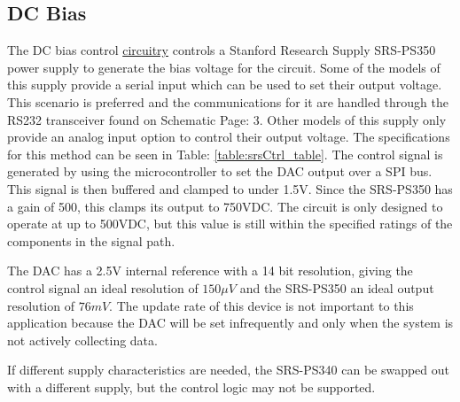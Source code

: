 \subsection {DC Bias}
\label{sec:dcBias}

The DC bias control \hyperlink{sch:dcBias}{circuitry} controls a Stanford Research Supply SRS-PS350 power supply to generate the bias voltage for the circuit. Some of the models of this supply provide a serial input which can be used to set their output voltage. This scenario is preferred and the communications for it are handled through the RS232 transceiver found on Schematic Page: 3. Other models of this supply only provide an analog input option to control their output voltage. The specifications for this method can be seen in Table: \ref{table:srsCtrl_table}. The control signal is generated by using the microcontroller to set the DAC output over a SPI bus. This signal is then buffered and clamped to under 1.5V. Since the SRS-PS350 has a gain of 500, this clamps its output to 750VDC. The circuit is only designed to operate at up to 500VDC, but this value is still within the specified ratings of the components in the signal path.



The DAC has a 2.5V internal reference with a 14 bit resolution, giving the control signal an ideal resolution of $150\mu V$ and the SRS-PS350 an ideal output resolution of $76mV$. The update rate of this device is not important to this application because the DAC will be set infrequently and only when the system is not actively collecting data.

If different supply characteristics are needed, the SRS-PS340 can be swapped out with a different supply, but the control logic may not be supported.

